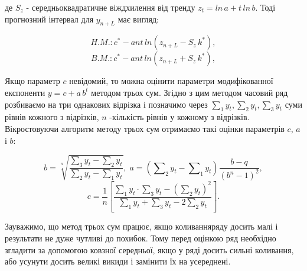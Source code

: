 \documentclass[a4paper, fontsize=10pt, oneside]{article}
\begin{document}
\noindent де $S_{z}$ - середньоквадратичне віждхилення від тренду $z_{t} = 	ln{\, a} + t\, ln{\,b}.$
Тоді прогнозний інтервал для $y_{n+L}$ має вигляд:

$$H.M.: c^{*} - ant\,ln{(z_{n+L} - S_{z} \, k^{*})},$$
$$B.M.: c^{*} - ant\,ln{(z_{n+L} + S_{z} \, k^{*})},$$

Якщо параметр $c$ невідомий, то можна оцінити параметри модифікованної експоненти $y = c + a \, b^{t}$ методом трьох сум. Згідно з цим методом часовий ряд розбиваємо на три однакових відрізка і позначимо через $\sum_{1}y_{t}, \sum_{2}y_{t}, \sum_{3}y_{t}$ суми рівнів кожного з відрізків, $n$ -кількість рівнів у кожному з відрізків. Вікростовуючи алгоритм методу трьох сум отримаємо такі оцінки параметрів $c$, $a$ і $b$:

$$ b = \sqrt[n]{\frac{\sum_{3}y_{t} - \sum_{2}y_{t}}{\sum_{2}y_{t} - \sum_{1}y_{t}}},\; a = ( \sum\nolimits_{2} y_{t} - \sum\nolimits_{1} y_{t} ) \frac{b - q}{(b^{n} - 1)^2},$$
$$ c = \frac{1}{n} \left[ \frac{\sum_{1}y_{t} \cdot \sum_{3}y_{t} - (\sum_{2}y_{t})^2}{\sum_{1} y_{t} + \sum_{3} y_{t} - 2 \sum_{2}y_{t}} \right].$$

Зауважимо, що метод трьох сум працює, якщо коливанняряду досить малі і результати не дуже чутливі до похибок. Тому перед оцінкою ряд необхідно згладити за допомогою ковзної середньої, якщо у ряді досить сильні коливання, або усунути досить великі викиди і замінити їх на усереднені.
\end{document}
